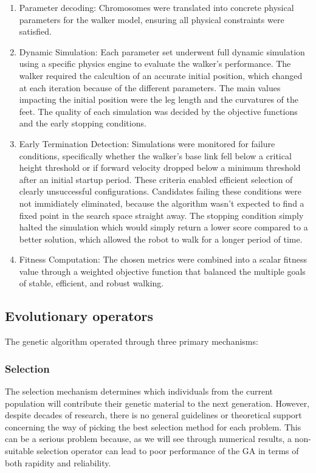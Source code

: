 \begin{enumerate}
    \item Parameter decoding: Chromosomes were translated into concrete physical parameters for the walker model, ensuring all physical constraints were satisfied.
    \item Dynamic Simulation: Each parameter set underwent full dynamic simulation using a specific physics engine to evaluate the walker's performance. 
    The walker required the calcultion of an accurate initial position, which changed at each iteration because of the different parameters.
    The main values impacting the initial position were the leg length and the curvatures of the feet. 
    The quality of each simulation was decided by the objective functions and the early stopping conditions.
    \item Early Termination Detection: Simulations were monitored for failure conditions, specifically whether the walker's base link fell below a critical height threshold or if forward velocity dropped below a minimum threshold after an initial startup period.
    These criteria enabled efficient selection of clearly unsuccessful configurations. Candidates failing these conditions were not immidiately eliminated, because the algorithm wasn't expected to find a fixed point in the search space straight away.
    The stopping condition simply halted the simulation which would simply return a lower score compared to a better solution, which allowed the robot to walk for a longer period of time.
    \item Fitness Computation: The chosen metrics were combined into a scalar fitness value through a weighted objective function that balanced the multiple goals of stable, efficient, and robust walking.
\end{enumerate}

\subsection{Evolutionary operators}
The genetic algorithm operated through three primary mechanisms:

\subsubsection*{Selection}
The selection mechanism determines which individuals from the current population will contribute their genetic material to the next generation.
However, despite decades of research, there is no general guidelines or theoretical support concerning the way of picking the best selection method for each problem.
This can be a serious problem because, as we will see through numerical results, a non-suitable selection operator can lead to poor performance of the GA in terms of both rapidity and reliability.\cite{Jebari2013}

